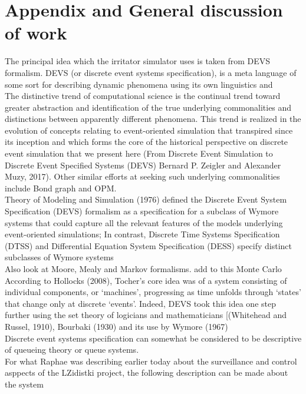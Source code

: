 \documentclass[a4paper, 12pt, notitlepage]{report}
\begin{document}
 
 \section{Appendix and General discussion of work}
 The principal idea which the irritator simulator uses is taken from DEVS formalism. DEVS (or discrete event systems specification), is a meta language of some sort for describing dynamic phenomena using its own linguistics and \\
 
The distinctive trend 
of computational science is the continual trend toward greater 
abstraction and identification of the true underlying 
commonalities and distinctions between apparently different 
phenomena. This trend is realized in the evolution of 
concepts relating to event-oriented simulation that transpired 
since its inception and which forms the core of the historical 
perspective on discrete event simulation that we present here (From Discrete Event Simulation to Discrete Event Specified Systems (DEVS)
Bernard P. Zeigler  and Alexander Muzy, 2017). Other similar efforts at seeking such underlying commonalities include Bond graph and OPM.\\

Theory of Modeling and Simulation (1976) defined the 
Discrete Event System Specification (DEVS) formalism as a 
specification for a subclass of Wymore systems that could 
capture all the relevant features of the models underlying 
event-oriented simulations; In contrast, Discrete Time 
Systems Specification (DTSS) and Differential Equation 
System Specification (DESS) specify distinct subclasses of 
Wymore systems\\

Also look at Moore, Mealy and Markov formalisms. add to this Monte Carlo\\

According to Hollocks (2008), 
Tocher’s core idea was of a system consisting of individual 
components, or ‘machines’, progressing as time unfolds 
through ‘states’ that change only at discrete ‘events’. Indeed, 
DEVS took this idea one step further using the set theory of 
logicians and mathematicians [(Whitehead and Russel, 1910), 
Bourbaki (1930) and its use by Wymore (1967)\\

Discrete event systems specification can somewhat be considered to be descriptive of queueing theory or queue systems.\\

For what Raphae was describing earlier today about the surveillance and control asppects of the LZidistki project, the following description can be made about the system
\end{document}
